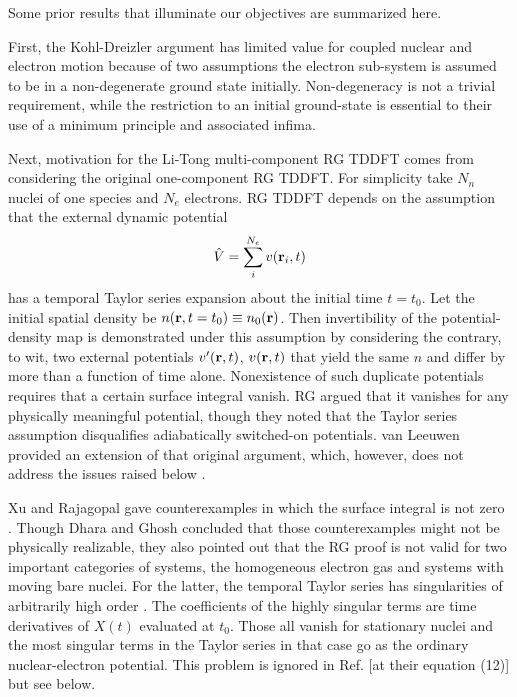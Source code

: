 \noindent Some prior results that illuminate our objectives are summarized
here.

First, the Kohl-Dreizler argument \cite{KD86} has limited value for coupled
nuclear and electron motion because of two assumptions the electron
sub-system is assumed to be in a non-degenerate ground state initially.
Non-degeneracy is not a trivial requirement, while the restriction to an
initial ground-state is essential to their use of a minimum principle and
associated infima.

Next, motivation for the Li-Tong multi-component RG TDDFT comes from
considering the original one-component RG TDDFT. For simplicity take $N_n$
nuclei of one species and $N_e$ electrons. RG TDDFT depends on the
assumption that the external dynamic potential 
\begin{equation}
\hat V = \sum_{i}^{N_e} v({\bf r}_{i},t)  \label{VextofT}
\end{equation}
has a temporal Taylor series expansion about the initial time $t=t_{0}$. Let
the initial spatial density be $n({\bf r}, t=t_{0}) \equiv n_{0}({\bf r})$.
Then invertibility of the potential-density map is demonstrated under this
assumption by considering the contrary, to wit, two external potentials $%
v^{\prime}({\bf r},t)$, $v({\bf r},t)$ that yield the same $n$ and differ by
more than a function of time alone. Nonexistence of such duplicate
potentials requires that a certain surface integral vanish. RG argued that
it vanishes for any physically meaningful potential, though they noted that
the Taylor series assumption disqualifies adiabatically switched-on
potentials. van Leeuwen provided an extension of that original argument,
which, however, does not address the issues raised below \cite{Leeuwen99}.

Xu and Rajagopal gave counterexamples in which the surface integral is not
zero \cite{Xu85}. Though Dhara and Ghosh \cite{Dhara87} concluded that those
counterexamples might not be physically realizable, they also pointed out
that the RG proof is not valid for two important categories of systems, the
homogeneous electron gas \cite{HEGexample} and systems with moving bare
nuclei. For the latter, the temporal Taylor series has singularities of
arbitrarily high order \cite{bareTaylor}. The coefficients of the highly
singular terms are time derivatives of $X(t)$ evaluated at $t_{0}$. Those
all vanish for stationary nuclei and the most singular terms in the Taylor
series in that case go as the ordinary nuclear-electron potential. This
problem is ignored in Ref.  [at their equation (12)] but
see below.

